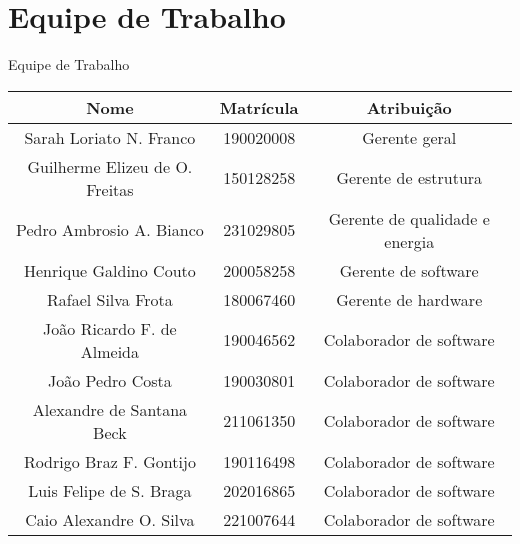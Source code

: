 \chapter{Equipe de Trabalho}

\begin{quadro}[htb]
  \caption{\label{quadro_equipe_trabalho}Equipe de Trabalho}

  \begin{tabular}{|c|c|c|}
    \hline
    \textbf{Nome} & \textbf{Matrícula} & \textbf{Atribuição} \\
    \hline
    Sarah Loriato N. Franco & 190020008 & Gerente geral \\
    \hline
    Guilherme Elizeu de O. Freitas & 150128258 & Gerente de estrutura \\
    \hline
    Pedro Ambrosio A. Bianco & 231029805 & Gerente de qualidade e energia \\
    \hline
    Henrique Galdino Couto & 200058258 & Gerente de software \\
    \hline
    Rafael Silva Frota & 180067460 & Gerente de hardware \\
    \hline
    João Ricardo F. de Almeida & 190046562 & Colaborador de software \\
    \hline
    João Pedro Costa & 190030801 & Colaborador de software \\
    \hline
    Alexandre de Santana Beck & 211061350 & Colaborador de software \\
    \hline
    Rodrigo Braz F. Gontijo & 190116498 & Colaborador de software \\
    \hline
    Luis Felipe de S. Braga & 202016865 & Colaborador de software \\
    \hline
    Caio Alexandre O. Silva & 221007644 & Colaborador de software \\
    \hline
  \end{tabular}

\end{quadro}
